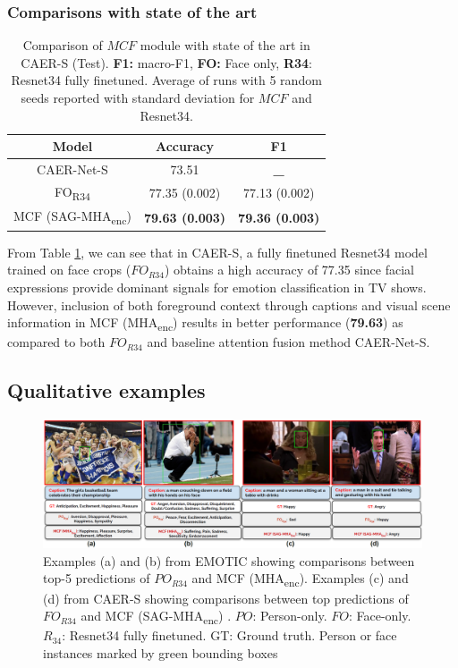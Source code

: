 \subsubsection{Comparisons with state of the art}
 \begin{table}[h!]
\centering
\begin{tabular}{|c|c|c|}
\hline
\textbf{Model}                               & \textbf{Accuracy}                      & \textbf{F1}                       \\ \hline
CAER-Net-S  \cite{CAER-S}                                & 73.51                             & \textbf{\_}                       \\ \hline
FO\textsubscript{R34}                                    & 77.35 (0.002)                     & 77.13 (0.002)                      \\ \hline
\multicolumn{1}{|l|}{MCF (SAG-MHA\textsubscript{enc})} & \multicolumn{1}{l|}{\textbf{79.63 (0.003)}} & \multicolumn{1}{l|}{\textbf{79.36 (0.003)}}\\ \hline
\end{tabular}
\caption{Comparison of $MCF$ module with state of the art in CAER-S (Test). \textbf{F1:} macro-F1, \textbf{FO:} Face only, \textbf{R34}: Resnet34 fully finetuned. Average of runs with 5 random seeds reported with standard deviation for $MCF$ and Resnet34.}
\label{MCFSAG}
\end{table}
From Table \ref{MCFSAG}, we can see that in CAER-S, a fully finetuned Resnet34 model trained on face crops ($FO_{R34}$) obtains a high accuracy of 77.35 since facial expressions provide dominant signals for emotion classification in TV shows. However, inclusion of both foreground context through captions and visual scene information in MCF (MHA\textsubscript{enc}) results in better performance (\textbf{79.63}) as compared to both $FO_{R34}$ and baseline attention fusion method CAER-Net-S. 
\subsection{Qualitative examples}
\begin{figure}[h!]
    \centering
    \includegraphics[width=\textwidth]{figures/EMOTIC_CAER_examples_updated.png}
    \caption{Examples (a) and (b) from EMOTIC showing comparisons between top-5 predictions of $PO_{R34}$ and MCF (MHA\textsubscript{enc}). Examples (c) and (d) from CAER-S showing comparisons between top predictions of $FO_{R34}$ and MCF (SAG-MHA\textsubscript{enc}) . $PO$: Person-only. $FO$: Face-only. $R_{34}$: Resnet34 fully finetuned. GT: Ground truth. Person or face instances marked by green bounding boxes}
    \label{qualfig}
\end{figure}


